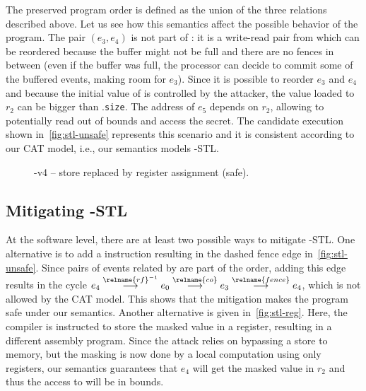 \documentclass[conference]{IEEEtran}
\begin{document}
The preserved program order  is defined as the union of the three relations described above.
Let us see how this semantics affect the possible behavior of the program.
The pair $(e_3,e_4)$ is not part of : it is a write-read pair from  which can be reordered because the buffer might not be full  %
and there are no fences in between (even if the buffer was full, the processor can decide to commit some of the buffered events, making room for $e_3$).
Since it is possible to reorder $e_3$ and $e_4$ and because the initial value of \varidx is controlled by the attacker, the value loaded to $r_2$ can be bigger than \varA.\texttt{size}.
The address of $e_5$ depends on $r_2$, allowing to potentially read out of bounds and access the secret.
The candidate execution shown in~\autoref{fig:stl-unsafe} represents this scenario and it is consistent according to our CAT model, i.e., our semantics models \spectre-\textsc{STL}.

\begin{figure}[t]
\centering
\scalebox{.8}{}
\caption{\spectre-v4 -- store replaced by register assignment (safe).}
\label{fig:stl-reg}
\end{figure}

\subsection{Mitigating \spectre-\textsc{STL}}
\label{sec:mitigating_sv4}

At the software level, there are at least two possible ways to mitigate \spectre-\textsc{STL}.
One alternative is to add a \fence instruction resulting in the dashed fence edge in~\autoref{fig:stl-unsafe}.
Since pairs of events related by  are part of the  order, adding this edge results in the cycle $e_4 \stackrel{\relname{\scriptsize rf}^{-1}}{\longrightarrow} e_0 \stackrel{\relname{\scriptsize co}}{\longrightarrow} e_3 \stackrel{\relname{\scriptsize fence}}{\longrightarrow} e_4$, which is not allowed by the CAT model.
This shows that the mitigation makes the program safe under our semantics.
Another alternative is given in~\autoref{fig:stl-reg}.
Here, the compiler is instructed to store the masked value in a register, resulting in a different assembly program. 
Since the attack relies on bypassing a store to memory, but the masking is now done by a local computation using only registers, our semantics guarantees that $e_4$ will get the masked value in $r_2$ and thus the access to \varA will be in bounds.
\end{document}
